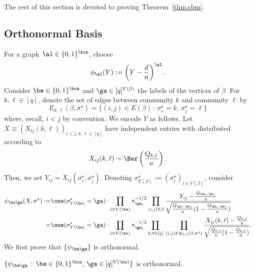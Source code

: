 \documentclass[11pt]{article}
\begin{document}
\noindent The rest of this section is devoted to proving Theorem~\ref{thm:sbm}.

\subsection{Orthonormal Basis}
For a graph $\al\in \{0,1\}^{\bcn}$, choose 
\[
\phi_{\al}(Y):=\left(Y-\frac{d}{n}\right)^{\al}.
\]
Consider $\be\in \{0,1\}^{\bcn}$ and $\ga \in [q]^{V(\beta)}$ the labels of the vertices of $\beta$. For $k,\ell\in[q]$, denote the set of edges between community $k$ and community $\ell$ by\[
E_{k,\ell}(\beta, \sigma^\star)=\{(i,j)\in E(\beta) \,:\, \sigma^\star_i = k, \, \sigma^\star_j = \ell\}
\]
where, recall, $i < j$ by convention. We encode $Y$ as follows. Let $X\equiv \left(X_{ij}(k,\ell)\right)_{i<j, k,\ell\in [q]}$ have independent entries with distributed according to \[
X_{ij}(k,\ell) \sim \Ber\left(\frac{Q_{k,\ell}}{n}\right).
\]
Then, we set $Y_{ij}=X_{ij}(\sigma^\star_i,\sigma^\star_j)$. Denoting $\sigma^\star_{V(\beta)}:=(\sigma^\star_i)_{i\in V(\beta)}$, consider
\[
\begin{split}
\psi_{\be\ga}(X,\sigma^\star)
:=& \one(\sigma^\star_{V(\be)}=\ga)\cdot \prod_{i\in V(\be)}\pi_{\ga_i}^{-1/2}\prod_{(i,j)\in \beta}\frac{Y_{ij}-\frac{Q_{\ga_i,\ga_j}}{n}}{\sqrt{\frac{Q_{\ga_i,\ga_j}}{n}(1-\frac{Q_{\ga_i,\ga_j}}{n})}}\\
=& \one(\sigma^\star_{V(\be)}=\ga)\cdot \prod_{i\in V(\be)}\pi_{\ga_i}^{-1/2}\prod_{k,\ell\in[q]} \; \prod_{(i,j)\in E_{k,\ell}(\beta,\sigma^\star)}\frac{X_{ij}(k,\ell)-\frac{Q_{k,\ell}}{n}}{\sqrt{\frac{Q_{k,\ell}}{n}(1-\frac{Q_{k,\ell}}{n})}}.
\end{split}
\]
We first prove that $\{\psi_{\be\ga}\}$ is orthonormal.
\begin{lemma}
    $\{\psi_{\be\ga} \,:\, \be\in \{0,1\}^{\bcn}, \, \ga \in [q]^{V(\be)}\}$ is orthonormal.
\end{lemma}
\end{document}
